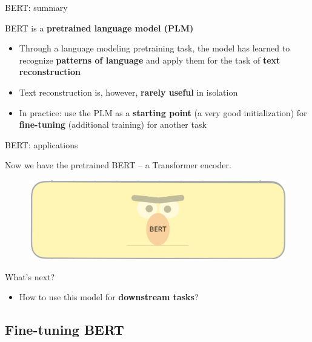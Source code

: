 \documentclass[12pt,aspectratio=169,handout]{beamer}
\begin{document}
\begin{frame}{BERT: summary}

BERT is a \textbf{pretrained language model (PLM)}

\pause

\begin{itemize}
	\item Through a language modeling pretraining task, the model has learned to recognize \textbf{patterns of language} and apply them for the task of \textbf{text reconstruction}
	\pause
	\item Text reconstruction is, however, \textbf{rarely useful} in isolation
	\pause
	\item In practice: use the PLM as a \textbf{starting point} (a very good initialization) for \textbf{fine-tuning} (additional training) for another task
\end{itemize}

\end{frame}

\begin{frame}{BERT: applications}

Now we have the pretrained BERT -- a Transformer encoder.

\begin{figure}[h]
	\includegraphics[height=3.5cm]{bert-viz}
\end{figure}

\pause
What's next?
\pause

\begin{itemize}
	\item How to use this model for \textbf{downstream tasks}?
\end{itemize}
\end{frame}

\subsection{Fine-tuning BERT}
\end{document}
